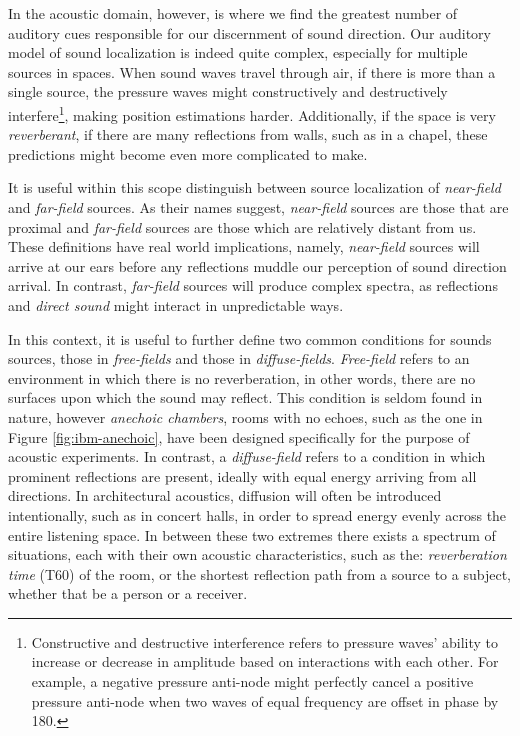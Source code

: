 In the acoustic domain, however, is where we find the greatest number of auditory cues responsible for our discernment of sound direction. Our auditory model of sound localization is indeed quite complex, especially for multiple sources in spaces. When sound waves travel through air, if there is more than a single source, the pressure waves might constructively and destructively interfere\footnote{Constructive and destructive interference refers to pressure waves' ability to increase or decrease in amplitude based on interactions with each other. For example, a negative pressure anti-node might perfectly cancel a positive pressure anti-node when two waves of equal frequency are offset in phase by 180\textdegree.}, making position estimations harder. Additionally, if the space is very \textit{reverberant}, if there are many reflections from walls, such as in a chapel, these predictions might become even more complicated to make.

It is useful within this scope distinguish between source localization of \textit{near-field} and \textit{far-field} sources. As their names suggest, \textit{near-field} sources are those that are proximal and \textit{far-field} sources are those which are relatively distant from us. These definitions have real world implications, namely, \textit{near-field} sources will arrive at our ears before any reflections muddle our perception of sound direction arrival. In contrast, \textit{far-field} sources will produce complex spectra, as reflections and \textit{direct sound} might interact in unpredictable ways. 

In this context, it is useful to further define two common conditions for sounds sources, those in \textit{free-fields} and those in \textit{diffuse-fields}. \textit{Free-field} refers to an environment in which there is no reverberation, in other words, there are no surfaces upon which the sound may reflect. This condition is seldom found in nature, however \textit{anechoic chambers}, rooms with no echoes, such as the one in Figure \ref{fig:ibm-anechoic}, have been designed specifically for the purpose of acoustic experiments. In contrast, a \textit{diffuse-field} refers to a condition in which prominent reflections are present, ideally with equal energy arriving from all directions. In architectural acoustics, diffusion will often be introduced intentionally, such as in concert halls, in order to spread energy evenly across the entire listening space. In between these two extremes there exists a spectrum of situations, each with their own acoustic characteristics, such as the: \textit{reverberation time} (T60) of the room, or the shortest reflection path from a source to a subject, whether that be a person or a receiver.

